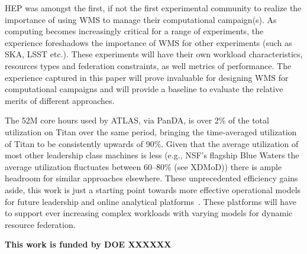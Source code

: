 
HEP was amongst the first, if not the first experimental community to realize
the importance of using WMS to manage their computational campaign(s). As
computing becomes increasingly critical for a range of experiments, the
experience foreshadows the importance of WMS for other experiments (such as
SKA, LSST etc.).  These experiments will have their own workload
characteristics, resources types and federation constraints, as well metrics
of performance. The experience captured in this paper will prove invaluable
for designing WMS for computational campaigns and will provide a baseline to
evaluate the relative merits of different approaches.

The 52M core hours used by ATLAS, via PanDA, is over 2\% of the total
utilization on Titan over the same period, bringing the time-averaged
utilization of Titan to be consistently upwards of 90\%. Given that the
average utilization of most other leadership class machines is less (e.g.,
NSF's flagship Blue Waters the average utilization fluctuates between
60--80\% (see XDMoD\cite{bw-sucks})) there is ample headroom for similar
approaches elsewhere. These unprecedented efficiency gains aside, this work
is just a starting point towards more effective operational models for future
leadership and online analytical platforms~\cite{foap-url}. These platforms
will have to support ever increasing complex workloads with varying models
for dynamic resource federation.

{\bf \footnotesize This work is funded by DOE XXXXXX \par}


